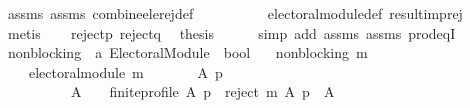\begin{isabellebody}
\ assms{\isacharparenleft}{\kern0pt}{}{\isacharparenright}{\kern0pt}\ assms{\isacharparenleft}{\kern0pt}{}{\isacharparenright}{\kern0pt}\ combine{\isacharunderscore}{\kern0pt}ele{\isacharunderscore}{\kern0pt}rej{\isacharunderscore}{\kern0pt}def\isanewline
\ \ \ \ \ \ \ \ \ \ electoral{\isacharunderscore}{\kern0pt}module{\isacharunderscore}{\kern0pt}def\ result{\isacharunderscore}{\kern0pt}imp{\isacharunderscore}{\kern0pt}rej\isanewline
\ \ \ \ \isamarkupfalse%
\ metis\isanewline
\ \ \isamarkupfalse%
\ reject{\isacharunderscore}{\kern0pt}p\ reject{\isacharunderscore}{\kern0pt}q\ \isamarkupfalse%
\ {\isacharquery}{\kern0pt}thesis\isanewline
\ \ \ \ \isamarkupfalse%
\ {\isacharparenleft}{\kern0pt}simp\ add{\isacharcolon}{\kern0pt}\ assms{\isacharparenleft}{\kern0pt}{}{\isacharparenright}{\kern0pt}\ assms{\isacharparenleft}{\kern0pt}{}{\isacharparenright}{\kern0pt}\ prod{\isacharunderscore}{\kern0pt}eqI{\isacharparenright}{\kern0pt}\isanewline
{}\isamarkupfalse%
%
\endisatagproof
{\isafoldproof}%
%
\isadelimproof
%
\endisadelimproof
%
\isadelimdocument
%
\endisadelimdocument
%
\isatagdocument
%
\isamarkuptrue%
%
\endisatagdocument
{\isafolddocument}%
%
\isadelimdocument
%
\endisadelimdocument
{}\isamarkupfalse%
\ non{\isacharunderscore}{\kern0pt}blocking\ {\isacharcolon}{\kern0pt}{\isacharcolon}{\kern0pt}\ {\isachardoublequoteopen}{\isacharprime}{\kern0pt}a\ Electoral{\isacharunderscore}{\kern0pt}Module\ {\isasymRightarrow}\ bool{\isachardoublequoteclose}\ \isanewline
\ \ {\isachardoublequoteopen}non{\isacharunderscore}{\kern0pt}blocking\ m\ {\isasymequiv}\isanewline
\ \ \ \ electoral{\isacharunderscore}{\kern0pt}module\ m\ {\isasymand}\isanewline
\ \ \ \ \ \ {\isacharparenleft}{\kern0pt}{\isasymforall}A\ p{\isachardot}{\kern0pt}\isanewline
\ \ \ \ \ \ \ \ \ \ {\isacharparenleft}{\kern0pt}{\isacharparenleft}{\kern0pt}A\ {\isasymnoteq}\ {\isacharbraceleft}{\kern0pt}{\isacharbraceright}{\kern0pt}\ {\isasymand}\ finite{\isacharunderscore}{\kern0pt}profile\ A\ p{\isacharparenright}{\kern0pt}\ {\isasymlongrightarrow}\ reject\ m\ A\ p\ {\isasymnoteq}\ A{\isacharparenright}{\kern0pt}{\isacharparenright}{\kern0pt}{\isachardoublequoteclose}%
\isadelimdocument
%
\endisadelimdocument
%
\isatagdocument
%
\isamarkuptrue%
%
\endisatagdocument
{\isafolddocument}%
%
\isadelimdocument
%
\endisadelimdocument
{}\isamarkupfalse%

\end{isabellebody}
